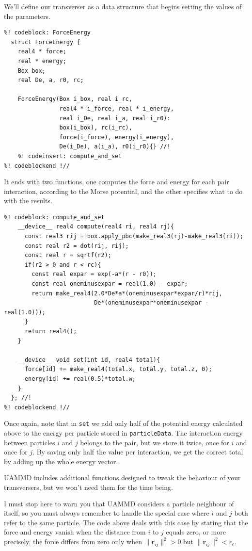 We'll define our transverser as a data structure that begins setting the values
of the parameters.
\begin{lstlisting}
%! codeblock: ForceEnergy
  struct ForceEnergy {
    real4 * force;
    real * energy;
    Box box;
    real De, a, r0, rc;

    ForceEnergy(Box i_box, real i_rc,
                real4 * i_force, real * i_energy,
                real i_De, real i_a, real i_r0):
                box(i_box), rc(i_rc),
                force(i_force), energy(i_energy),
                De(i_De), a(i_a), r0(i_r0){} //!
    %! codeinsert: compute_and_set
%! codeblockend !//
\end{lstlisting}
It ends with two functions, one computes the force and energy for each pair 
interaction, according to the Morse potential, and the other specifies what to 
do with the results.
\begin{lstlisting}
%! codeblock: compute_and_set
    __device__ real4 compute(real4 ri, real4 rj){
      const real3 rij = box.apply_pbc(make_real3(rj)-make_real3(ri));
      const real r2 = dot(rij, rij);
      const real r = sqrtf(r2);
      if(r2 > 0 and r < rc){
        const real expar = exp(-a*(r - r0));
        const real oneminusexpar = real(1.0) - expar;
        return make_real4(2.0*De*a*(oneminusexpar*expar/r)*rij,
                          De*(oneminusexpar*oneminusexpar - real(1.0)));
      }
      return real4();
    }

    __device__ void set(int id, real4 total){
      force[id] += make_real4(total.x, total.y, total.z, 0);
      energy[id] += real(0.5)*total.w;
    }
  }; //!
%! codeblockend !//
\end{lstlisting}
Once again, note that in \texttt{set} we add only half of the potential energy
calculated above to the energy per particle stored in \texttt{particleData}.
The interaction energy between particles $i$ and $j$ belongs to the pair, but
we store it twice, once for $i$ and once for $j$. By saving only half the value 
per interaction, we get the correct total by adding up the whole energy vector.

UAMMD includes additional functions designed to tweak the behaviour of your 
transversers, but we won't need them for the time being.

I must stop here to warn you that UAMMD considers a particle neighbour of 
itself, so you must always remember to handle the special case where $i$ and $j$ 
both refer to the same particle. The code above deals with this case by stating 
that the force and energy vanish when the distance from $i$ to $j$ equals zero, 
or more precisely, the force differs from zero only when $\|\mathbf{r}_{ij}\|^2 
> 0$ but $\|\mathbf{r}_{ij}\|^2 < r_c$.

